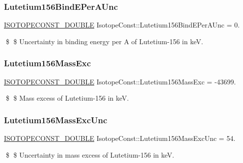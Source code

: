 \subsubsection{\texorpdfstring{Lutetium156\+Bind\+E\+Per\+A\+Unc}{Lutetium156BindEPerAUnc}}
{\footnotesize\ttfamily \mbox{\hyperlink{group___isotope_const-_macros_ga8f45a7272ce02c0b4c65c44636ed719a}{I\+S\+O\+T\+O\+P\+E\+C\+O\+N\+S\+T\+\_\+\+D\+O\+U\+B\+LE}} Isotope\+Const\+::\+Lutetium156\+Bind\+E\+Per\+A\+Unc = 0.}

\$ \$ Uncertainty in binding energy per A of Lutetium-\/156 in keV. \mbox{\label{group___isotope_const-_lutetium-_lu156_ga80cf35b0fd833955275eff56c2d0803c}} 
\subsubsection{\texorpdfstring{Lutetium156\+Mass\+Exc}{Lutetium156MassExc}}
{\footnotesize\ttfamily \mbox{\hyperlink{group___isotope_const-_macros_ga8f45a7272ce02c0b4c65c44636ed719a}{I\+S\+O\+T\+O\+P\+E\+C\+O\+N\+S\+T\+\_\+\+D\+O\+U\+B\+LE}} Isotope\+Const\+::\+Lutetium156\+Mass\+Exc = -\/43699.}

\$ \$ Mass excess of Lutetium-\/156 in keV. \mbox{\label{group___isotope_const-_lutetium-_lu156_ga54ebdeae4bb29597cd8501d77f73f8e0}} 
\subsubsection{\texorpdfstring{Lutetium156\+Mass\+Exc\+Unc}{Lutetium156MassExcUnc}}
{\footnotesize\ttfamily \mbox{\hyperlink{group___isotope_const-_macros_ga8f45a7272ce02c0b4c65c44636ed719a}{I\+S\+O\+T\+O\+P\+E\+C\+O\+N\+S\+T\+\_\+\+D\+O\+U\+B\+LE}} Isotope\+Const\+::\+Lutetium156\+Mass\+Exc\+Unc = 54.}

\$ \$ Uncertainty in mass excess of Lutetium-\/156 in keV. \mbox{\label{group___isotope_const-_lutetium-_lu156_ga3f8317be32c398d31b3976a071db1c1b}} 
